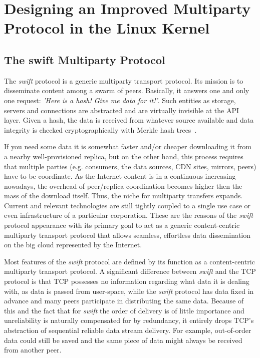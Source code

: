 
\chapter{Designing an Improved Multiparty Protocol in the Linux Kernel}
\label{chapter:multiparty}


\section{The swift Multiparty Protocol}
\label{sec:multiparty:swift}

The \textit{swift} protocol is a generic multiparty transport protocol. Its
mission is to disseminate content among a swarm of peers. Basically, it
answers one and only one request: \textit{'Here is a hash! Give me data for
it!'}. Such entities as storage, servers and connections are abstracted and
are virtually invisible at the API layer. Given a hash, the data is received
from whatever source available and data integrity is checked cryptographically
with Merkle hash trees~\cite{merkle}.


If you need some data it is somewhat faster and/or cheaper downloading it from
a nearby well-provisioned replica, but on the other hand, this process
requires that multiple parties (e.g. consumers, the data sources, CDN
sites, mirrors, peers) have to be coordinate. As the Internet
content is in a continuous increasing nowadays, the overhead of peer/replica
coordination becomes higher then the mass of the download itself. Thus, the
niche for multiparty transfers expands. Current and relevant technologies
are still tightly coupled to a single use case or even infrastructure of a
particular corporation. These are the reasons of the \textit{swift} protocol
appearance with its primary goal to act as a generic content-centric
multiparty transport protocol that allows seamless, effortless data
dissemination on the big cloud represented by the Internet.

Most features of the \textit{swift} protocol are defined by its function as a
content-centric multiparty transport protocol. A significant difference
between \textit{swift} and the TCP protocol is that TCP possesses no
information regarding what data it is dealing with, as data is passed from
user-space, while the \textit{swift} protocol has data fixed in advance
and many peers participate in distributing the same data. Because of this and
the fact that for \textit{swift} the order of delivery is of little importance
and unreliability is naturally compensated for by redundancy, it entirely
drops TCP's abstraction of sequential reliable data stream delivery. For
example, out-of-order data could still be saved and the same piece of data
might always be received from another peer.

